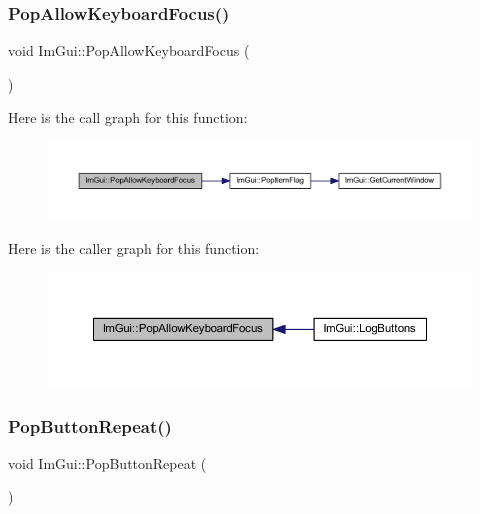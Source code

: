 \subsubsection{\texorpdfstring{Pop\+Allow\+Keyboard\+Focus()}{PopAllowKeyboardFocus()}}
{\footnotesize\ttfamily void Im\+Gui\+::\+Pop\+Allow\+Keyboard\+Focus (\begin{DoxyParamCaption}{ }\end{DoxyParamCaption})}

Here is the call graph for this function\+:
\nopagebreak
\begin{figure}[H]
\begin{center}
\leavevmode
\includegraphics[width=350pt]{namespace_im_gui_a017db69016de97685aec978e504dc96d_cgraph}
\end{center}
\end{figure}
Here is the caller graph for this function\+:
\nopagebreak
\begin{figure}[H]
\begin{center}
\leavevmode
\includegraphics[width=350pt]{namespace_im_gui_a017db69016de97685aec978e504dc96d_icgraph}
\end{center}
\end{figure}
\mbox{\label{namespace_im_gui_a0f883e8507be797ca8ba1448d2b9dbb0}} 
\subsubsection{\texorpdfstring{Pop\+Button\+Repeat()}{PopButtonRepeat()}}
{\footnotesize\ttfamily void Im\+Gui\+::\+Pop\+Button\+Repeat (\begin{DoxyParamCaption}{ }\end{DoxyParamCaption})}

